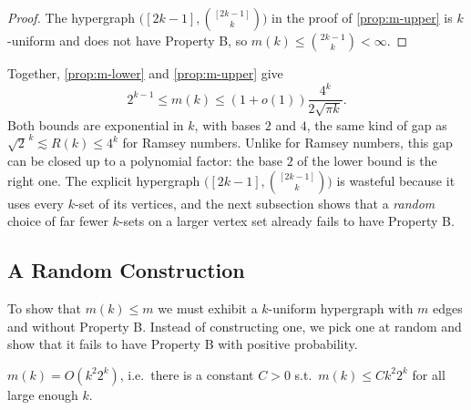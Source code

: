 \begin{proof}
    The hypergraph \(\bigl([2k-1], \binom{[2k-1]}{k}\bigr)\) in the proof of \autoref{prop:m-upper} is \(k\)-uniform and does not have Property B, so \(m(k) \le \binom{2k-1}{k} < \infty\).
\end{proof}

\begin{remark}
    Together, \autoref{prop:m-lower} and \autoref{prop:m-upper} give
    \[
        2^{k-1} \le m(k) \le (1 + o(1)) \frac{4^k}{2\sqrt{\pi k}}.
    \]
    Both bounds are exponential in \(k\), with bases \(2\) and \(4\), the same kind of gap as \(\sqrt{2}^{\,k} \lesssim R(k) \le 4^k\) for Ramsey numbers. Unlike for Ramsey numbers, this gap can be closed up to a polynomial factor: the base \(2\) of the lower bound is the right one. The explicit hypergraph \(\bigl([2k-1], \binom{[2k-1]}{k}\bigr)\) is wasteful because it uses every \(k\)-set of its vertices, and the next subsection shows that a \emph{random} choice of far fewer \(k\)-sets on a larger vertex set already fails to have Property B.
\end{remark}

\subsection{A Random Construction}

To show that \(m(k) \le m\) we must exhibit a \(k\)-uniform hypergraph with \(m\) edges and without Property B. Instead of constructing one, we pick one at random and show that it fails to have Property B with positive probability.

\begin{theorem}[Erd\H{o}s, 1964]\label{thm:m-upper-random}
    \(m(k) = O(k^2 2^k)\), i.e.\ there is a constant \(C > 0\) s.t.\ \(m(k) \le C k^2 2^k\) for all large enough \(k\).
\end{theorem}

